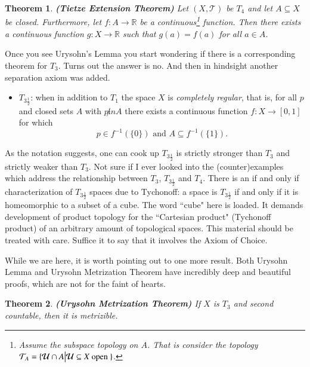 \documentclass[11pt]{amsart}
\newtheorem{theorem}{Theorem}
\newcommand{\<}{\langle}
\renewcommand{\>}{\rangle}
\newcommand{\R}{\mathbb{R}}
\newcommand{\U}{\mathcal{U}}
\newcommand{\T}{\mathcal{T}}
\begin{document}
\begin{theorem}
{\bf (Tietze Extension Theorem)} Let $(X,\T)$ be $T_4$ and let $A\subseteq X$ be closed. Furthermore, let 
$f:A\to \R$ be a continuous\footnote{Assume the subspace topology on $A$. That is consider the topology $\T_A=\{\U\cap A\big{|} \U\subseteq X \text{\ open\ }\}$.} function. Then there exists a continuous function $g:X\to \R$ such that $g(a)=f(a)$ for all $a\in A$.
\end{theorem}

Once you see Urysohn's Lemma you start wondering if there is a corresponding theorem for $T_3$. Turns out the answer is no. And then in hindsight another separation axiom was added. 

\begin{itemize}
\item $T_{3\frac{1}{2}}$: when in addition to $T_1$ the space $X$ is \emph{completely regular}, that is, for all $p$ and closed sets $A$ with $p\not in A$ there exists a continuous function $f:X\to [0,1]$ for which 
$$p\in f^{-1}(\{0\}) \text{\ \ and\ \ } A\subseteq f^{-1}(\{1\}).$$
\end{itemize}

As the notation suggests, one can cook up $T_{3\frac{1}{2}}$ is strictly stronger than $T_3$ and strictly weaker than $T_3$. Not sure if I ever looked into the (counter)examples which address the relationship between $T_3$, $T_{3\frac{1}{2}}$ and $T_4$. There is an if and only if characterization of $T_{3\frac{1}{2}}$ spaces due to Tychonoff: a space is $T_{3\frac{1}{2}}$ if and only if it is homeomorphic to a subset of a cube. The word ``cube" here is loaded. It demands development of product topology for the ``Cartesian product" (Tychonoff product) of an arbitrary amount of topological spaces. This material should be treated with care. Suffice it to say that it involves the Axiom of Choice. 

While we are here, it is worth pointing out to one more result. Both Urysohn Lemma and Urysohn Metrization Theorem have incredibly deep and beautiful proofs, which are not for the faint of hearts. 

\begin{theorem} {\bf (Urysohn Metrization Theorem)} 
If $X$ is $T_3$ and second countable, then it is metrizible.
\end{theorem}
\end{document}
